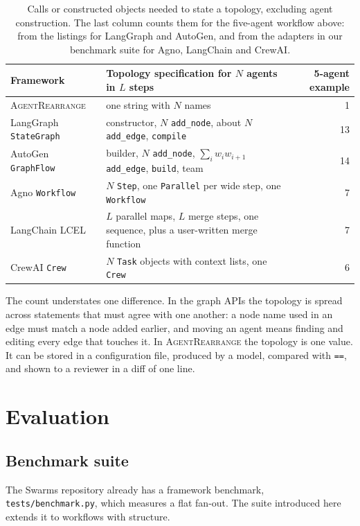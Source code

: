 \documentclass[11pt]{article}
\newcommand{\code}[1]{\texttt{#1}}
\newcommand{\AR}{\textsc{AgentRearrange}}
\begin{document}
\begin{table}[ht]
\centering
\small
\begin{tabularx}{\linewidth}{@{}lXr@{}}
\toprule
Framework & Topology specification for $N$ agents in $L$ steps & 5-agent example \\
\midrule
\AR{} & one string with $N$ names & 1 \\
LangGraph \code{StateGraph} & constructor, $N$ \code{add\_node}, about $N$ \code{add\_edge}, \code{compile} & 13 \\
AutoGen \code{GraphFlow} & builder, $N$ \code{add\_node}, $\sum_i w_i w_{i+1}$ \code{add\_edge}, \code{build}, team & 14 \\
Agno \code{Workflow} & $N$ \code{Step}, one \code{Parallel} per wide step, one \code{Workflow} & 7 \\
LangChain LCEL & $L$ parallel maps, $L$ merge steps, one sequence, plus a user-written merge function & 7 \\
CrewAI \code{Crew} & $N$ \code{Task} objects with context lists, one \code{Crew} & 6 \\
\bottomrule
\end{tabularx}
\caption{Calls or constructed objects needed to state a topology, excluding agent construction. The last column counts them for the five-agent workflow above: from the listings for LangGraph and AutoGen, and from the adapters in our benchmark suite for Agno, LangChain and CrewAI.}
\label{tab:spec}
\end{table}

The count understates one difference. In the graph APIs the topology is spread across statements that must agree with one another: a node name used in an edge must match a node added earlier, and moving an agent means finding and editing every edge that touches it. In \AR{} the topology is one value. It can be stored in a configuration file, produced by a model, compared with \code{==}, and shown to a reviewer in a diff of one line.

\section{Evaluation}
\label{sec:eval}

\subsection{Benchmark suite}

The Swarms repository already has a framework benchmark, \code{tests/benchmark.py}, which measures a flat fan-out. The suite introduced here extends it to workflows with structure.
\end{document}

